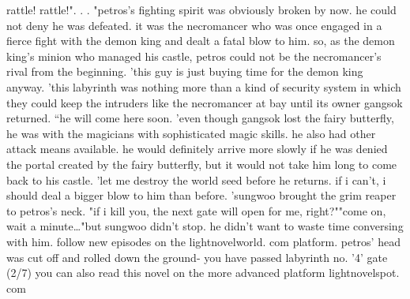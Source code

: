 rattle! rattle!".
.
.
"petros's fighting spirit was obviously broken by now.
 he could not deny he was defeated.
 it was the necromancer who was once engaged in a fierce fight with the demon king and dealt a fatal blow to him.
 so, as the demon king's minion who managed his castle, petros could not be the necromancer's rival from the beginning.
'this guy is just buying time for the demon king anyway.
'this labyrinth was nothing more than a kind of security system in which they could keep the intruders like the necromancer at bay until its owner gangsok returned.
``he will come here soon.
'even though gangsok lost the fairy butterfly, he was with the magicians with sophisticated magic skills.
 he also had other attack means available.
he would definitely arrive more slowly if he was denied the portal created by the fairy butterfly, but it would not take him long to come back to his castle.
'let me destroy the world seed before he returns.
 if i can't, i should deal a bigger blow to him than before.
'sungwoo brought the grim reaper to petros's neck.
"if i kill you, the next gate will open for me, right?""come on, wait a minute…"but sungwoo didn't stop.
 he didn't want to waste time conversing with him.
follow new episodes on the lightnovelworld.
c‌om platform.
petros' head was cut off and rolled down the ground- you have passed labyrinth no.
 '4' gate (2/7) you can also read this novel on the more advanced platform lightnovelspot.
com

 